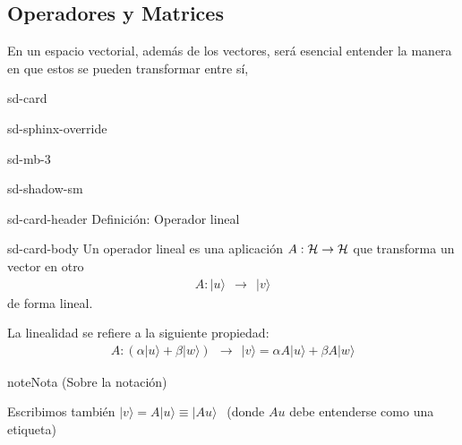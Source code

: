 \documentclass[letterpaper,10pt,english]{jupyterBook}
\newcommand{\ket}[1]{|#1\rangle}
\newcommand{\Hil}{{\cal H}}
\begin{document}
\subsection{Operadores y Matrices}
\label{\detokenize{docs/Part_01_Formalismo/Chapter_01_02_Formalismo_matem_xe1tico/01_03_Operadores_myst:operadores-y-matrices}}
\sphinxAtStartPar
En un espacio vectorial, además de los vectores, será esencial entender la manera en que estos se pueden transformar entre sí,

\begin{sphinxuseclass}{sd-card}
\begin{sphinxuseclass}{sd-sphinx-override}
\begin{sphinxuseclass}{sd-mb-3}
\begin{sphinxuseclass}{sd-shadow-sm}
\begin{sphinxuseclass}{sd-card-header}
\sphinxAtStartPar
Definición: Operador lineal

\end{sphinxuseclass}
\begin{sphinxuseclass}{sd-card-body}
\sphinxAtStartPar
Un operador lineal es una aplicación \(A:\Hil \to \Hil\)  que transforma un vector  en otro
\begin{equation*}
\begin{split}
A: \ket{u} ~~\to ~~ \ket{v}   
\end{split}
\end{equation*}
\sphinxAtStartPar
de forma lineal.

\end{sphinxuseclass}
\end{sphinxuseclass}
\end{sphinxuseclass}
\end{sphinxuseclass}
\end{sphinxuseclass}
\sphinxAtStartPar
La linealidad se refiere a la siguiente propiedad:
\begin{equation*}
\begin{split}
A: (\alpha\ket{u} + \beta\ket{w})~~\to ~~ \ket{v} =\alpha A\ket{u} + \beta A\ket{w}
\end{split}
\end{equation*}
\begin{sphinxadmonition}{note}{Nota (Sobre la notación) }

\sphinxAtStartPar
Escribimos también \(\ket{v} = A\ket{u} \equiv \ket{Au}\) \(~~\)(donde \(Au\) debe entenderse como una etiqueta)
\end{sphinxadmonition}
\end{document}
